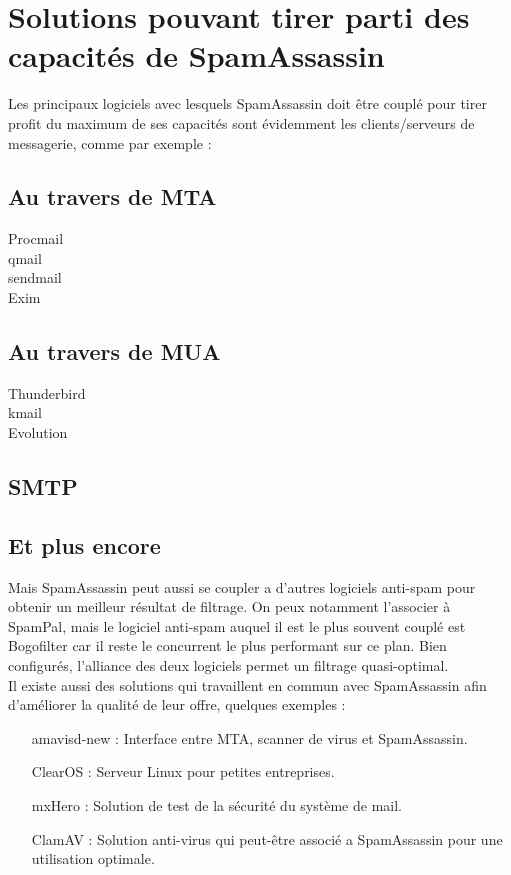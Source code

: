 \documentclass[a4paper,11pt]{article}
\begin{document}
\section{Solutions pouvant tirer parti des capacités de SpamAssassin}
Les principaux logiciels avec lesquels SpamAssassin doit être couplé pour tirer profit du maximum de ses capacités sont évidemment les clients/serveurs de messagerie, comme par exemple :

\subsection{Au travers de MTA}
\begin{description}
\item [Procmail]
\item [qmail]
\item [sendmail]
\item [Exim]
\end{description}
\subsection{Au travers de MUA}
\begin{description}
\item [Thunderbird]
\item [kmail]
\item [Evolution]
\end{description}

\subsection{SMTP}
\subsection{Et plus encore}
Mais SpamAssassin peut aussi se coupler a d'autres logiciels anti-spam pour obtenir un meilleur résultat de filtrage. On peux notamment l'associer à SpamPal, mais le logiciel anti-spam auquel il est le plus souvent couplé est Bogofilter car il reste le concurrent le plus performant sur ce plan. Bien configurés, l'alliance des deux logiciels permet un filtrage quasi-optimal.\\
Il existe aussi des solutions qui travaillent en commun avec SpamAssassin afin d'améliorer la qualité de leur offre, quelques exemples :
\begin{itemize}
\item [amavisd-new] : Interface entre MTA, scanner de virus et SpamAssassin.
\item [ClearOS] : Serveur Linux pour petites entreprises.
\item [mxHero] : Solution de test de la sécurité du système de mail.
\item [ClamAV] : Solution anti-virus qui peut-être associé a SpamAssassin pour une utilisation optimale.
\end{itemize}
\end{document}
